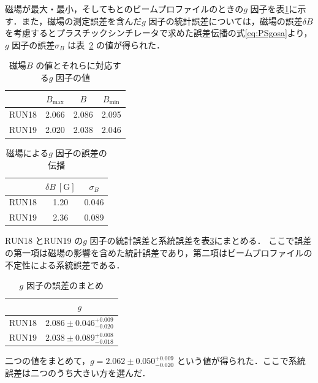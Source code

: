 磁場が最大・最小，そしてもとのビームプロファイルのときの$g$ 因子を表\ref{tab:mag_g}に示す．また，磁場の測定誤差を含んだ$g$ 因子の統計誤差については，磁場の誤差$\delta B$ を考慮するとプラスチックシンチレータで求めた誤差伝播の式\eqref{eq:PSgosa}より，$g$ 因子の誤差$\sigma_{B}$ は表~\ref{tab:g_error} の値が得られた．

\begin{table}[H]
\caption{磁場$B$ の値とそれらに対応する$g$ 因子の値}
\centering
\begin{tabular}{cccc}\toprule%
{} & $B_\mathrm{max}$ & $B$ & $B_\mathrm{min}$  \\ \midrule
RUN18 & 2.066 & 2.086 & 2.095 \\
RUN19 & 2.020 & 2.038 & 2.046 \\ \bottomrule
\end{tabular}
\label{tab:mag_g}
\end{table}

\begin{table}[H]%
\caption{磁場による$g$ 因子の誤差の伝播}
\centering
\begin{tabular}{ccc}\toprule
{} & $\delta B~[\mathrm{G}]$ &  $\sigma_{B}$  \\ \midrule
RUN18 & 1.20 & 0.046  \\
RUN19 & 2.36 & 0.089 \\ \bottomrule
\end{tabular}
\label{tab:g_error}
\end{table}

RUN18 とRUN19 の$g$ 因子の統計誤差と系統誤差を表\ref{tab:NaIggosamatome}にまとめる．
ここで誤差の第一項は磁場の影響を含めた統計誤差であり，第二項はビームプロファイルの不定性による系統誤差である．

\begin{table}[H]%
\caption{$g$ 因子の誤差のまとめ}
\centering
\begingroup
\renewcommand{\arraystretch}{1.2}%
\begin{tabular}{cc}\toprule
{} &   $g$  \\ \midrule
RUN18 & $2.086 \pm 0.046^{+0.009}_{-0.020} $  \\
RUN19 & $2.038 \pm 0.089^{+0.008}_{-0.018} $  \\ \bottomrule
\end{tabular}\label{tab:NaIggosamatome}
\endgroup
\end{table}

二つの値をまとめて，$g = 2.062 \pm 0.050^{+0.009}_{-0.020}$ という値が得られた．ここで系統誤差は二つのうち大きい方を選んだ．

%

